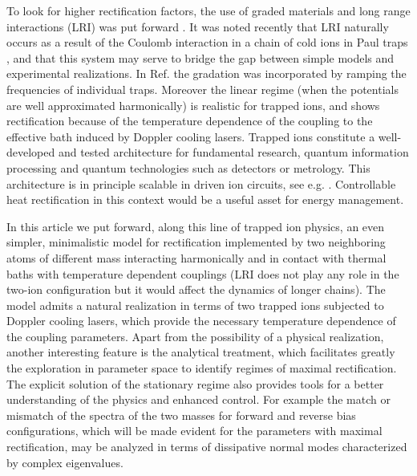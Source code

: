 To look for higher rectification factors, the use of graded  materials \cite{Yang2007}
and long range interactions (LRI) was  put forward \cite{Pereira2013,Chen2015}.
It was noted recently that LRI naturally occurs as a result of the Coulomb interaction in
a  chain of cold ions in Paul traps \cite{Simon2019}, and that this system may serve to bridge the gap between
simple models and experimental realizations. In Ref. \cite{Simon2019} the gradation was incorporated
by ramping the frequencies of individual traps. Moreover the linear regime (when the potentials are well approximated harmonically)
is realistic for trapped ions, and  shows rectification because of the temperature dependence of  the coupling to the effective bath
induced by Doppler cooling lasers.  Trapped ions constitute a well-developed and tested  architecture for fundamental research,
quantum information processing and
quantum technologies such as detectors or metrology. This architecture is  in principle scalable in driven ion circuits, see e.g.  \cite{Bruzewicz2019}.
Controllable heat rectification in this context
would be a useful asset for energy management.

In this article we put forward, along this line of trapped ion physics, an even simpler, minimalistic model
for rectification
implemented by two neighboring atoms of different mass interacting harmonically
and in contact with thermal baths with temperature dependent couplings (LRI does not play any role in the two-ion configuration but it
would affect the dynamics of longer chains).
The model admits a  natural realization in terms of two trapped ions subjected to  Doppler cooling lasers, which provide the
necessary temperature dependence of the coupling parameters. Apart from the possibility of a physical realization, another interesting
feature is the analytical treatment, which facilitates greatly the exploration in parameter  space
to  identify regimes of maximal rectification.
The explicit solution of the stationary regime also provides tools for a better understanding of the physics and enhanced control.
For example the match or mismatch of the spectra of the two masses for forward and reverse bias configurations, which will be made evident
for the parameters with maximal
rectification, may be analyzed in terms of dissipative normal modes characterized by complex eigenvalues.


